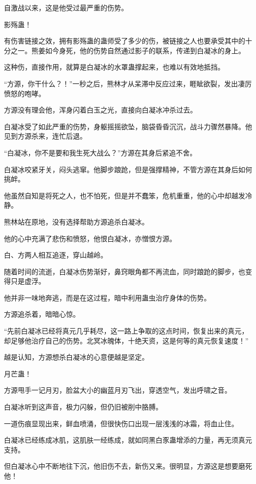 \begin{this_body}
自激战以来，这是他受过最严重的伤势。

影殇蛊！

有伤害链接之效，拥有影殇蛊的蛊师受了多少的伤，被链接之人也要承受其中的十分之一。熊姜如今身死，他的伤势自然通过影子的联系，传递到白凝冰的身上。

这种伤，直接作用，就算是白凝冰的水罩蛊撑起来，也难以有效地抵挡。

“方源，你干什么？！”一秒之后，熊林才从呆滞中反应过来，睚眦欲裂，发出凄厉愤怒的咆哮。

方源没有理会他，浑身闪着白玉之光，直接向白凝冰冲杀过去。

白凝冰受了如此严重的伤势，身躯摇摇欲坠，脑袋昏昏沉沉，战斗力骤然暴降。他见到方源杀来，连忙后退。

“白凝冰，你不是要和我生死大战么？”方源在其身后紧追不舍。

白凝冰咬紧牙关，闷头逃窜。他脚步踉跄，但是强撑精神，不管方源在其身后如何挑衅。

他虽然自知是将死之人，也不怕死，但是并不蠢笨，危机重重，他的心中却越发冷静。

熊林站在原地，没有选择帮助方源追杀白凝冰。

他的心中充满了悲伤和愤怒，他恨白凝冰，亦憎恨方源。

白、方两人相互追逐，穿山越岭。

随着时间的流逝，白凝冰伤势渐好，鼻窍眼角都不再流血，同时踉跄的脚步，也变得只是虚浮。

他并非一味地奔逃，而是在这过程，暗中利用蛊虫治疗身体的伤势。

方源追杀着，暗暗心惊。

“先前白凝冰已经将真元几乎耗尽，这一路上争取的这点时间，恢复出来的真元，却足够他治疗自己的伤势。北冥冰魄体，十绝天资，这是何等的真元恢复速度！”

越是认知，方源想杀白凝冰的心意便越是坚定。

月芒蛊！

方源甩手一记月刃，脸盆大小的幽蓝月刃飞出，穿透空气，发出呼啸之音。

白凝冰听到这声音，极力闪躲，但仍旧被削中胳膊。

一道伤痕显现出来，鲜血喷涌，但很快伤口出现一层浅浅的冰霜，将血止住。

白凝冰已经练成冰肌，这肌肤一经练成，就如同黑白豕蛊增添的力量，再无须真元支持。

但白凝冰心中不断地往下沉，他旧伤不去，新伤又来。很明显，方源这是想要磨死他！

\end{this_body}

